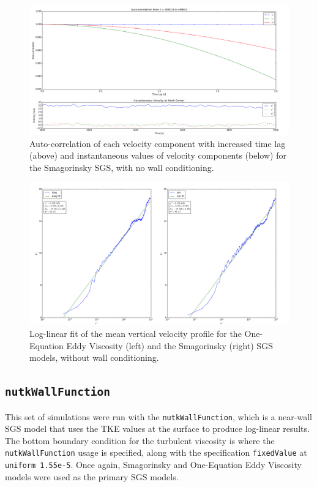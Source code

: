 \documentclass[12pt]{article}
\begin{document}
\begin{figure}[H]
\centering
\includegraphics[scale=0.35]{none/sm_stability.png}
\caption{Auto-correlation of each velocity component with increased time lag (above) and instantaneous values of velocity components (below) for the Smagorinsky SGS, with no wall conditioning.}
\label{none_sm_stab}
\end{figure}

\begin{figure}[H]
\centering
\includegraphics[scale=0.35]{none/keq_sm_log.png}
\caption{Log-linear fit of the mean vertical velocity profile for the One-Equation Eddy Viscosity (left) and the Smagorinsky (right) SGS models, without wall conditioning.}
\label{none_keq_sm_log}
\end{figure}

\subsection{\texttt{nutkWallFunction}}
This set of simulations were run with the \texttt{nutkWallFunction}, which is a near-wall SGS model that uses the TKE values at the surface to produce log-linear results.  The bottom boundary condition for the turbulent viscosity is where the \texttt{nutkWallFunction} usage is specified, along with the specification \texttt{fixedValue} at \texttt{uniform 1.55e-5}.  Once again, Smagorinsky and One-Equation Eddy Viscosity models were used as the primary SGS models.
\end{document}
